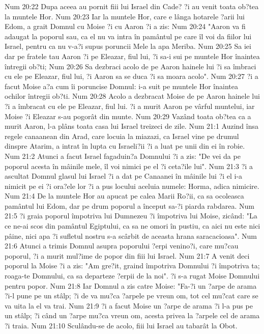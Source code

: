 Num 20:22  Dupa aceea au pornit fiii lui Israel din Cade? ?i au venit toata ob?tea la muntele Hor.
Num 20:23  Iar la muntele Hor, care e lânga hotarele ?arii lui Edom, a grait Domnul cu Moise ?i cu Aaron ?i a zis:
Num 20:24  "Aaron va fi adaugat la poporul sau, ca el nu va intra în pamântul pe care îl voi da fiilor lui Israel, pentru ca nu v-a?i supus poruncii Mele la apa Meriba.
Num 20:25  Sa iei dar pe fratele tau Aaron ?i pe Eleazar, fiul lui, ?i sa-i sui pe muntele Hor înaintea întregii ob?ti;
Num 20:26  Sa dezbraci acolo de pe Aaron hainele lui ?i sa îmbraci cu ele pe Eleazar, fiul lui, ?i Aaron sa se duca ?i sa moara acolo".
Num 20:27  ?i a facut Moise a?a cum îi poruncise Domnul: i-a suit pe muntele Hor înaintea ochilor întregii ob?ti.
Num 20:28  Acolo a dezbracat Moise de pe Aaron hainele lui ?i a îmbracat cu ele pe Eleazar, fiul lui. ?i a murit Aaron pe vârful muntelui, iar Moise ?i Eleazar s-au pogorât din munte.
Num 20:29  Vazând toata ob?tea ca a murit Aaron, l-a plâns toata casa lui Israel treizeci de zile.
Num 21:1  Auzind însa regele canaanean din Arad, care locuia la miazazi, ca Israel vine pe drumul dinspre Atarim, a intrat în lupta cu Israeli?ii ?i a luat pe unii din ei în robie.
Num 21:2  Atunci a facut Israel fagaduin?a Domnului ?i a zis: "De vei da pe poporul acesta în mâinile mele, îl voi nimici pe el ?i ceta?ile lui".
Num 21:3  ?i a ascultat Domnul glasul lui Israel ?i a dat pe Canaanei în mâinile lui ?i el i-a nimicit pe ei ?i ora?ele lor ?i a pus locului aceluia numele: Horma, adica nimicire.
Num 21:4  De la muntele Hor au apucat pe calea Marii Ro?ii, ca sa ocoleasca pamântul lui Edom, dar pe drum poporul a început sa-?i piarda rabdarea.
Num 21:5  ?i graia poporul împotriva lui Dumnezeu ?i împotriva lui Moise, zicând: "La ce ne-ai scos din pamântul Egiptului, ca sa ne omori în pustiu, ca aici nu este nici pâine, nici apa ?i sufletul nostru s-a scârbit de aceasta hrana saracacioasa".
Num 21:6  Atunci a trimis Domnul asupra poporului ?erpi venino?i, care mu?cau poporul, ?i a murit mul?ime de popor din fiii lui Israel.
Num 21:7  A venit deci poporul la Moise ?i a zis: "Am gre?it, graind împotriva Domnului ?i împotriva ta; roaga-te Domnului, ca sa departeze ?erpii de la noi". ?i s-a rugat Moise Domnului pentru popor.
Num 21:8  Iar Domnul a zis catre Moise: "Fa-?i un ?arpe de arama ?i-l pune pe un stâlp; ?i de va mu?ca ?arpele pe vreun om, tot cel mu?cat care se va uita la el va trai.
Num 21:9  ?i a facut Moise un ?arpe de arama ?i l-a pus pe un stâlp; ?i când un ?arpe mu?ca vreun om, acesta privea la ?arpele cel de arama ?i traia.
Num 21:10  Sculându-se de acolo, fiii lui Israel au tabarât la Obot.
